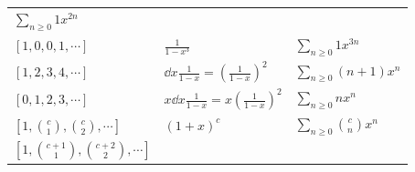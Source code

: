 \begin{longtable}[]{@{}lll@{}}
\begin{minipage}[t]{0.30\columnwidth}
\(\displaystyle\sum_{n\geq 0}1x^{2n}\)\strut
\end{minipage}\tabularnewline
\begin{minipage}[t]{0.30\columnwidth}\raggedright
\([1, 0, 0, 1, \cdots]\)\strut
\end{minipage} & \begin{minipage}[t]{0.30\columnwidth}\raggedright
\(\frac 1 {1-x^3}\)\strut
\end{minipage} & \begin{minipage}[t]{0.30\columnwidth}\raggedright
\(\displaystyle\sum_{n\geq 0}1x^{3n}\)\strut
\end{minipage}\tabularnewline
\begin{minipage}[t]{0.30\columnwidth}\raggedright
\([1, 2, 3, 4, \cdots]\)\strut
\end{minipage} & \begin{minipage}[t]{0.30\columnwidth}\raggedright
\(\dd{}{x}\frac 1 {1-x} = \left(\frac{1}{1-x}\right)^2\)\strut
\end{minipage} & \begin{minipage}[t]{0.30\columnwidth}\raggedright
\(\displaystyle\sum_{n\geq 0}(n+1)x^{n}\)\strut
\end{minipage}\tabularnewline
\begin{minipage}[t]{0.30\columnwidth}\raggedright
\([0, 1, 2, 3, \cdots]\)\strut
\end{minipage} & \begin{minipage}[t]{0.30\columnwidth}\raggedright
\(x\dd{}{x}\frac 1 {1-x} = x\left(\frac{1}{1-x}\right)^2\)\strut
\end{minipage} & \begin{minipage}[t]{0.30\columnwidth}\raggedright
\(\displaystyle\sum_{n\geq 0}nx^{n}\)\strut
\end{minipage}\tabularnewline
\begin{minipage}[t]{0.30\columnwidth}\raggedright
\([1,{c \choose 1}, {c \choose 2}, \cdots]\)\strut
\end{minipage} & \begin{minipage}[t]{0.30\columnwidth}\raggedright
\((1+x)^c\)\strut
\end{minipage} & \begin{minipage}[t]{0.30\columnwidth}\raggedright
\(\displaystyle\sum_{n\geq 0}{c \choose n}x^n\)\strut
\end{minipage}\tabularnewline
\begin{minipage}[t]{0.30\columnwidth}\raggedright
\([1, {c+1 \choose 1}, {c+2 \choose 2}, \cdots]\)\strut
\end{minipage} & \begin{minipage}[t]{0.30\columnwidth}\raggedright

\end{minipage}
\end{longtable}
